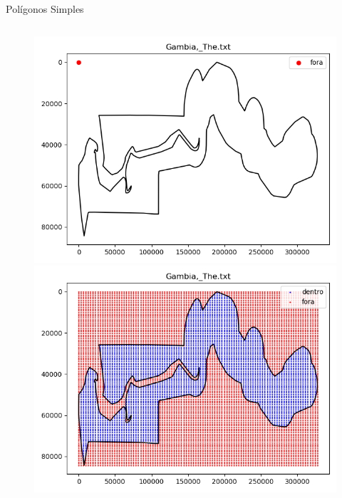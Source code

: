 \documentclass[aspectratio=169]{beamer}
\begin{document}
\begin{frame}{Polígonos Simples}
\begin{columns}
\begin{center}
\begin{figure}
\begin{overprint}
        \includegraphics[width=1.0\textwidth]{figures/Gambia.png}
        \includegraphics[width=1.0\textwidth]{figures/Gambia_grid.png}
        \end{overprint}
      \end{figure}
    \end{center}
  \end{columns}
\end{frame}
\end{document}

